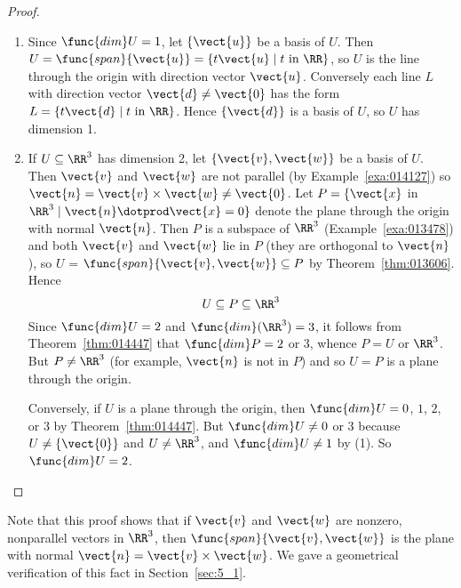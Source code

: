 \begin{proof}
\begin{enumerate}
\item Since $\func{dim} U = 1$, let $\{\vect{u}\}$ be a basis of $U$. Then $U = \func{span}\{\vect{u}\} = \{t\vect{u} \mid t \mbox{ in }\RR\}$, so $U$ is the line through the origin with direction vector $\vect{u}$. Conversely each line $L$ with direction vector $\vect{d} \neq \vect{0}$ has the form $L = \{t\vect{d} \mid t \mbox{ in }\RR\}$. Hence $\{\vect{d}\}$ is a basis of $U$, so $U$ has dimension 1.

\item If $U \subseteq \RR^3$ has dimension 2, let $\{\vect{v}, \vect{w}\}$ be a basis of $U$. Then $\vect{v}$ and $\vect{w}$ are not parallel (by Example~\ref{exa:014127}) so $\vect{n} = \vect{v} \times \vect{w} \neq \vect{0}$. Let $P = \{\vect{x}$ in $\RR^3 \mid \vect{n} \dotprod \vect{x} = 0\}$ denote the plane through the origin with normal $\vect{n}$. Then $P$ is a subspace of $\RR^3$ (Example~\ref{exa:013478}) and both $\vect{v}$ and $\vect{w}$ lie in $P$ (they are orthogonal to $\vect{n}$), so $U$ = $\func{span}\{\vect{v}, \vect{w}\} \subseteq P$ by Theorem~\ref{thm:013606}. Hence
\begin{equation*}
U \subseteq P \subseteq \RR^3
\end{equation*}
Since $\func{dim} U = 2$ and $\func{dim}(\RR^3) = 3$, it follows from Theorem~\ref{thm:014447} that $\func{dim} P = 2$ or $3$, whence $P = U$ or $\RR^3$. But $P \neq \RR^3$ (for example, $\vect{n}$ is not in $P$) and so $U = P$ is a plane through the origin.

Conversely, if $U$ is a plane through the origin, then $\func{dim} U = 0$, $1$, $2$, or $3$ by Theorem~\ref{thm:014447}. But $\func{dim} U \neq 0$ or $3$ because $U \neq \{\vect{0}\}$ and $U \neq \RR^3$, and $\func{dim} U \neq 1$ by (1). So $\func{dim} U = 2$.
\end{enumerate}
\vspace*{-2em}\end{proof}

\noindent Note that this proof shows that if $\vect{v}$ and $\vect{w}$ are nonzero, nonparallel vectors in $\RR^3$, then $\func{span}\{\vect{v}, \vect{w}\}$ is the plane with normal $\vect{n} = \vect{v} \times \vect{w}$. We gave a geometrical verification of this fact in Section~\ref{sec:5_1}.
